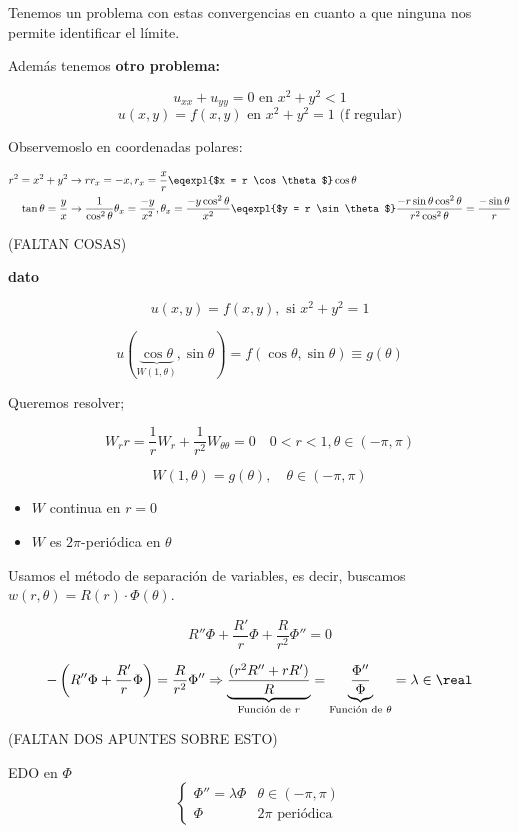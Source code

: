 		Tenemos un problema con estas convergencias en cuanto a que ninguna nos permite identificar el límite.

		Además tenemos \textbf{otro problema:}

		\[u_{xx} + u_{yy} = 0 \text{ en } x^2 + y^2 < 1 \]
		\[u(x,y) = f(x,y) \text{ en } x^2 + y^2 = 1 \text{  (f regular)}\]

		Observemoslo en coordenadas polares:

		\begin{align*}
		 r^2 = x^2 + y^2  &\rightarrow rr_x = -x , r_x = \frac{x}{r} \eqexpl{$x = r \cos \theta $} \cos \theta \\
		 \tan \theta = \frac{y}{x} &\rightarrow \frac{1}{\cos^2 \theta} \theta_x = \frac{-y}{x^2}, \theta_x = \frac{-y \cos^2\theta}{x^2} \eqexpl{$y = r \sin \theta$} \frac{-r \sin \theta \cos^2 \theta}{r^2 \cos^2 \theta} = \frac{- \sin \theta}{r}
		\end{align*}

		(FALTAN COSAS)


		\textbf{dato}

		\[ u(x,y) = f(x,y), \text{ si } x^2 + y^2 = 1\]

		\[ u(\underbrace{\cos \theta}_{W(1,\theta)}, \sin \theta) = f(\cos \theta, \sin \theta) \equiv g(\theta)\]

		Queremos resolver;

		\[ W_rr = \frac{1}{r} W_r + \frac{1}{r^2} W_{\theta \theta} = 0 \quad 0 < r < 1, \theta \in (-\pi, \pi)\]

		\[W(1, \theta) = g(\theta), \quad \theta \in (-\pi,\pi) \]

		\begin{itemize}
			\item $W$ continua en $r=0$
			\item $W$ es $2\pi$-periódica en $\theta$
		\end{itemize}

		Usamos el método de separación de variables, es decir, buscamos $w(r, \theta) = R(r)\cdot \Phi(\theta)$.

		\[R''\Phi + \frac{R'}{r}\Phi + \frac{R}{r^2} \Phi'' = 0 \]

		\[ - \left( R'' \Phi + \frac{R'}{r}\Phi \right) = \frac{R}{r^2} \Phi'' \Rightarrow \underbrace{\frac{(r^2R''+rR')}{R}}_{\text{Función de }r} = \underbrace{\frac{\Phi''}{\Phi}}_{\text{Función de }\theta} = \lambda \in \real \]

		(FALTAN DOS APUNTES SOBRE ESTO)


		EDO en $\Phi$
		\[
		\begin{cases}
			\Phi'' = \lambda \Phi & \theta \in (-\pi, \pi) \\
			\Phi & 2\pi \text{ periódica }
		\end{cases}\]


